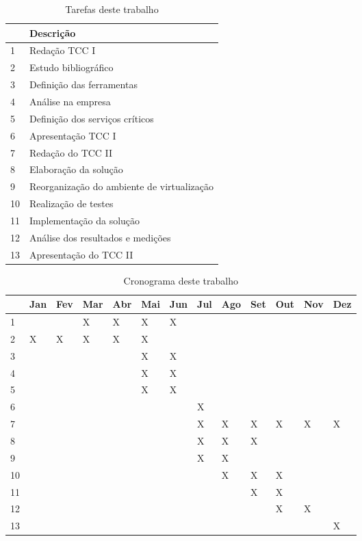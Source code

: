 \begin{table}[h!]\normalsize
\caption {Tarefas deste trabalho}
\label{tab:impltarefas}
\begin{center}
\begin{tabular}{|l|l|}\hline
 & Descrição \\\hline
1 & Redação TCC I \\\hline
2 & Estudo bibliográfico \\\hline
3 & Definição das ferramentas \\\hline
4 & Análise na empresa \\\hline
5 & Definição dos serviços críticos \\\hline
6 & Apresentação TCC I \\\hline
7 & Redação do TCC II \\\hline
8 & Elaboração da solução \\\hline
9 & Reorganização do ambiente de virtualização \\\hline
10 & Realização de testes \\\hline
11 & Implementação da solução \\\hline
12 & Análise dos resultados e medições \\\hline
13 & Apresentação do TCC II \\\hline
\end{tabular}
\end{center}
\end{table}

\begin{table}[h!]\normalsize
\caption {Cronograma deste trabalho}
\label{tab:implcronograma}
\begin{center}
\begin{tabular}{|l|l|l|l|l|l|l|l|l|l|l|l|l|}\hline
 & Jan & Fev & Mar & Abr & Mai & Jun & Jul & Ago & Set & Out & Nov & Dez \\\hline
1 & & & X & X & X & X & & & & & & \\\hline
2 & X & X & X & X & X & & & & & & & \\\hline
3 & & & & & X & X & & & & & & \\\hline
4 & & & & & X & X & & & & & & \\\hline
5 & & & & & X & X & & & & & & \\\hline
6 & & & & & & & X & & & & & \\\hline
7 & & & & & & & X & X & X & X & X & X \\\hline
8 & & & & & & & X & X & X & & & \\\hline
9 & & & & & & & X & X & & & & \\\hline
10 & & & & & & & & X & X & X & & \\\hline
11 & & & & & & & & & X & X & & \\\hline
12 & & & & & & & & & & X & X & \\\hline
13 & & & & & & & & & & & & X \\\hline
\end{tabular}
\end{center}
\end{table}
